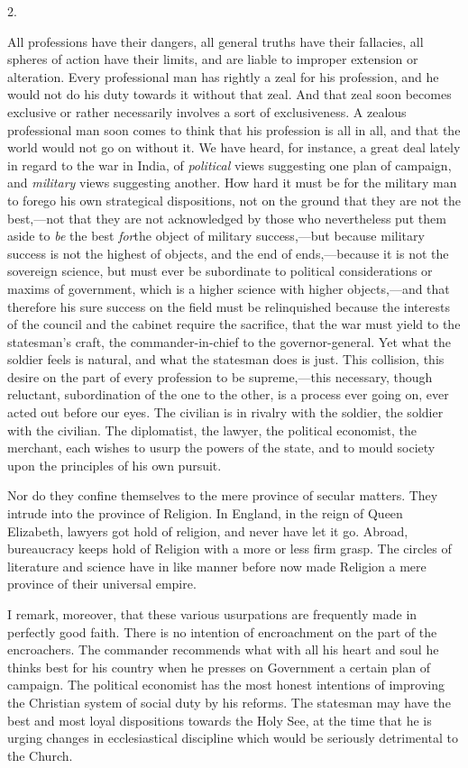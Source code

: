 2.

All professions have their dangers, all general truths have their
fallacies, all spheres of action have their limits, and are liable to
improper extension or alteration. Every professional man has
rightly a zeal for his profession, and he would not do his duty
towards it without that zeal. And that zeal soon becomes exclusive or
rather necessarily involves a sort of exclusiveness. A zealous
professional man soon comes to think that his profession is all in
all, and that the world would not go on without it. We have heard, for
instance, a great deal lately in regard to the war in India, of \emph{political}
views suggesting one plan of campaign, and \emph{military} views
suggesting another. How hard it must be for the military man to forego
his own strategical dispositions, not on the ground that they are not
the best,—not that they are not acknowledged by those who
nevertheless put them aside to \emph{be} the best \emph{for}the
object of military success,—but because military success is not the
highest of objects, and the end of ends,—because it is not the
sovereign science, but must ever be subordinate to political
considerations or maxims of government, which is a higher science with
higher objects,—and that therefore his sure success on the field
must be relinquished because the interests of the council and the
cabinet require the sacrifice, that the war must yield to the
statesman's craft, the commander-in-chief to the governor-general. Yet
what the soldier feels is natural, and what the statesman does is
just. This collision, this desire on the part of every profession to
be supreme,—this necessary, though reluctant, subordination of the
one to the other, is a process ever going on, ever acted out before
our eyes. The civilian is in rivalry with the soldier, the soldier
with the civilian. The diplomatist, the lawyer, the political
economist, the merchant, each wishes to usurp the powers of the state,
and to mould society upon the principles of his own pursuit.

Nor do they confine themselves to the mere province of secular matters. They intrude into the province of Religion. In
England, in the reign of Queen Elizabeth, lawyers got hold of
religion, and never have let it go. Abroad, bureaucracy keeps hold of
Religion with a more or less firm grasp. The circles of literature and
science have in like manner before now made Religion a mere province
of their universal empire.

I remark, moreover, that these various usurpations are frequently
made in perfectly good faith. There is no intention of encroachment on
the part of the encroachers. The commander recommends what with all
his heart and soul he thinks best for his country when he presses on
Government a certain plan of campaign. The political economist has the
most honest intentions of improving the Christian system of social
duty by his reforms. The statesman may have the best and most loyal
dispositions towards the Holy See, at the time that he is urging
changes in ecclesiastical discipline which would be seriously
detrimental to the Church.

